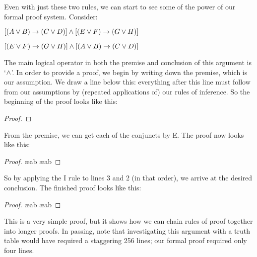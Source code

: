 Even with just these two rules, we can start to see some of the power of our formal proof system. Consider:
\begin{earg}
\item[] $[(A\vee B)\rightarrow(C\vee D)] \wedge [(E \vee F) \rightarrow (G\vee H)]$
\item[\therefore] $[(E \vee F) \rightarrow (G\vee H)] \wedge [(A\vee B)\rightarrow(C\vee D)]$
\end{earg}
The main logical operator in both the premise and conclusion of this argument is `$\wedge$'. In order to provide a proof, we begin by writing down the premise, which is our assumption. We draw a line below this: everything after this line must follow from our assumptions by (repeated applications of) our rules of inference. So the beginning of the proof looks like this:
\begin{proof}
\end{proof}
From the premise, we can get each of the conjuncts by {\eand}E. The proof now looks like this:
\begin{proof}
	 \ae{ab}
	 \ae{ab}
\end{proof}
So by applying the {\eand}I rule to lines 3 and 2 (in that order), we arrive at the desired conclusion. The finished proof looks like this:
\begin{proof}

	 \ae{ab}
	 \ae{ab}
	 
\end{proof}
This is a very simple proof, but it shows how we can chain rules of proof together into longer proofs. In passing, note that investigating this argument with a truth table would have required a staggering 256 lines; our formal proof required only four lines. 

